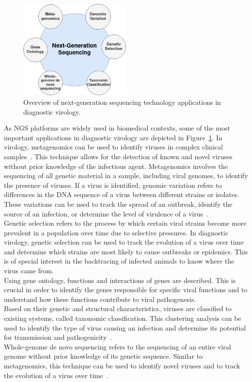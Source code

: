 \begin{figure}
	\centering
	\includegraphics[width=0.5\textwidth]{media/other/ngs.png}
	\caption{Overview of next-generation sequencing technology applications in diagnostic virology.}
	\label{fig:ngs}
\end{figure}

As NGS platforms are widely used in biomedical contexts, some of the most important applications in diagnostic virology are depicted in Figure~\ref{fig:ngs}. In virology, metagenomics can be used to identify viruses in complex clinical samples~\cite{chiu2019clinical}. This technique allows for the detection of known and novel viruses without prior knowledge of the infectious agent. Metagenomics involves the sequencing of all genetic material in a sample, including viral genomes, to identify the presence of viruses. If a virus is identified, genomic variation refers to differences in the DNA sequence of a virus between different strains or isolates. These variations can be used to track the spread of an outbreak, identify the source of an infection, or determine the level of virulence of a virus~\cite{capobianchi2013next}. \\
Genetic selection refers to the process by which certain viral strains become more prevalent in a population over time due to selective pressures. In diagnostic virology, genetic selection can be used to track the evolution of a virus over time and determine which strains are most likely to cause outbreaks or epidemics. This is of special interest in the backtracing of infected animals to know where the virus came from. \\
Using gene ontology, functions and interactions of genes are described. This is crucial in order to identify the genes responsible for specific viral functions and to understand how these functions contribute to viral pathogenesis. \\
Based on their genetic and structural characteristics, viruses are classified to existing systems, called taxonomic classification. This clustering analysis can be used to identify the type of virus causing an infection and determine its potential for transmission and pathogenicity~\cite{dutilh2021perspective}.\\
Whole-genome de novo sequencing refers to the sequencing of an entire viral genome without prior knowledge of its genetic sequence. Similar to metagenomics, this technique can be used to identify novel viruses and to track the evolution of a virus over time~\cite{slatko2018overview}.

